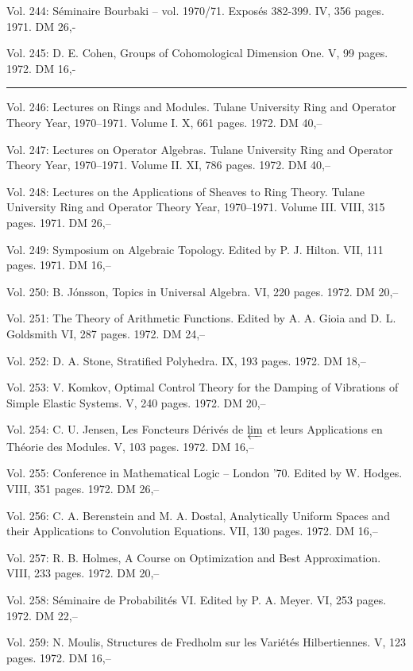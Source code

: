 Vol. 244: Séminaire Bourbaki -- vol. 1970/71. Exposés 382-399. IV, 356 pages. 1971. DM 26,-

Vol. 245: D. E. Cohen, Groups of Cohomological Dimension One. V, 99 pages. 1972. DM 16,-



\noindent\rule{\linewidth}{0.4pt}

Vol. 246: Lectures on Rings and Modules. Tulane University Ring and Operator Theory Year, 1970--1971. Volume I. X, 661 pages. 1972. DM 40,--

Vol. 247: Lectures on Operator Algebras. Tulane University Ring and Operator Theory Year, 1970--1971. Volume II. XI, 786 pages. 1972. DM 40,--

Vol. 248: Lectures on the Applications of Sheaves to Ring Theory. Tulane University Ring and Operator Theory Year, 1970--1971. Volume III. VIII, 315 pages. 1971. DM 26,--

Vol. 249: Symposium on Algebraic Topology. Edited by P. J. Hilton. VII, 111 pages. 1971. DM 16,--

Vol. 250: B. Jónsson, Topics in Universal Algebra. VI, 220 pages. 1972. DM 20,--

Vol. 251: The Theory of Arithmetic Functions. Edited by A. A. Gioia and D. L. Goldsmith VI, 287 pages. 1972. DM 24,--

Vol. 252: D. A. Stone, Stratified Polyhedra. IX, 193 pages. 1972. DM 18,--

Vol. 253: V. Komkov, Optimal Control Theory for the Damping of Vibrations of Simple Elastic Systems. V, 240 pages. 1972. DM 20,--

Vol. 254: C. U. Jensen, Les Foncteurs Dérivés de $\varprojlim$ et leurs Applications en Théorie des Modules. V, 103 pages. 1972. DM 16,--

Vol. 255: Conference in Mathematical Logic -- London '70. Edited by W. Hodges. VIII, 351 pages. 1972. DM 26,--

Vol. 256: C. A. Berenstein and M. A. Dostal, Analytically Uniform Spaces and their Applications to Convolution Equations. VII, 130 pages. 1972. DM 16,--

Vol. 257: R. B. Holmes, A Course on Optimization and Best Approximation. VIII, 233 pages. 1972. DM 20,--

Vol. 258: Séminaire de Probabilités VI. Edited by P. A. Meyer. VI, 253 pages. 1972. DM 22,--

Vol. 259: N. Moulis, Structures de Fredholm sur les Variétés Hilbertiennes. V, 123 pages. 1972. DM 16,--

